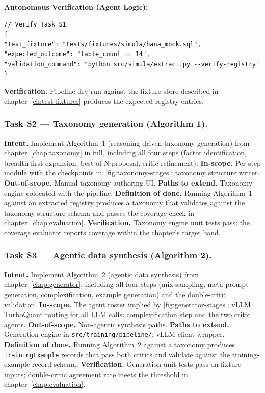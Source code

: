 \documentclass[12pt,a4paper,twoside]{report}
\begin{document}
\textbf{Autonomous Verification (Agent Logic):}
\begin{lstlisting}[language=jsonx]
// Verify Task S1
{
"test_fixture": "tests/fixtures/simula/hana_mock.sql",
"expected_outcome": "table_count == 14",
"validation_command": "python src/simula/extract.py --verify-registry"
}
\end{lstlisting}

\textbf{Verification.} Pipeline dry-run against the fixture store
described in chapter~\ref{ch:test-fixtures} produces the expected
registry entries.

\subsubsection{Task S2 --- Taxonomy generation (Algorithm 1).}
\textbf{Intent.} Implement Algorithm~1 (reasoning-driven taxonomy
generation) from chapter~\ref{chap:taxonomy} in full, including all
four steps (factor identification, breadth-first expansion,
best-of-N proposal, critic refinement).
\textbf{In-scope.} Per-step module with the checkpoints
in~\ref{fig:taxonomy-stages}; taxonomy structure writer.
\textbf{Out-of-scope.} Manual taxonomy authoring UI.
\textbf{Paths to extend.} Taxonomy engine colocated with the
pipeline.
\textbf{Definition of done.} Running Algorithm~1 against an extracted
registry produces a taxonomy that validates against the taxonomy
structure schema and passes the coverage check in
chapter~\ref{chap:evaluation}.
\textbf{Verification.} Taxonomy engine unit tests pass; the
coverage evaluator reports coverage within the chapter's target
band.

\subsubsection{Task S3 --- Agentic data synthesis (Algorithm 2).}
\textbf{Intent.} Implement Algorithm~2 (agentic data synthesis) from
chapter~\ref{chap:generator}, including all four steps (mix
sampling, meta-prompt generation, complexification, example
generation) and the double-critic validation.
\textbf{In-scope.} The agent roster implied by
\ref{fig:generator-stages}; vLLM TurboQuant routing for all LLM
calls; complexification step and the two critic agents.
\textbf{Out-of-scope.} Non-agentic synthesis paths.
\textbf{Paths to extend.} Generation engine in
\texttt{src/training/pipeline/}; vLLM client wrapper.
\textbf{Definition of done.} Running Algorithm~2 against a taxonomy
produces \texttt{TrainingExample} records that pass both critics and
validate against the training-example record schema.
\textbf{Verification.} Generation unit tests pass on fixture inputs;
double-critic agreement rate meets the threshold in
chapter~\ref{chap:evaluation}.
\end{document}
